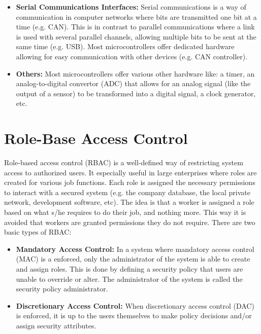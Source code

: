 \begin{itemize}
	\item \textbf{Serial Communications Interfaces:} Serial communications is a way of communication in computer networks where bits are transmitted one bit at a time (e.g. CAN). This is in contrast to parallel communications where a link is used with several parallel channels, allowing multiple bits to be sent at the same time (e.g. USB). Most microcontrollers offer dedicated hardware allowing for easy communication with other devices (e.g. CAN controller).
	
	\item \textbf{Others:} Most microcontrollers offer various other hardware like: a timer, an analog-to-digital convertor (ADC) that allows for an analog signal (like the output of a sensor) to be transformed into a digital signal, a clock generator, etc.
\end{itemize}

\section{Role-Base Access Control}
\label{sec:RBAC}

Role-based access control (RBAC) is a well-defined way of restricting system access to authorized users. It especially useful in large enterprises where roles are created for various job functions. Each role is assigned the necessary permissions to interact with a secured system (e.g. the company database, the local private network, development software, etc). The idea is that a worker is assigned a role based on what s/he requires to do their job, and nothing more. This way it is avoided that workers are granted permissions they do not require. There are two basic types of RBAC\cite{wiki:RBAC}:

\begin{itemize}
	\item \textbf{Mandatory Access Control:} In a system where mandatory access control (MAC) is a enforced, only the administrator of the system is able to create and assign roles. This is done by defining a security policy that users are unable to override or alter. The administrator of the system is called the security policy administrator.
	
	\item \textbf{Discretionary Access Control:} When discretionary access control (DAC) is enforced, it is up to the users themselves to make policy decisions and/or assign security attributes.
\end{itemize}

